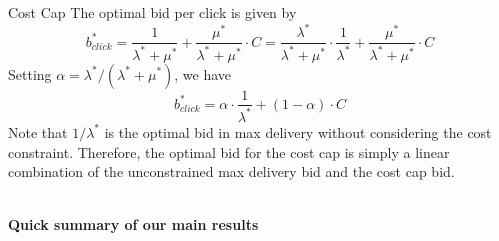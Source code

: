 \documentclass[../main.tex]{subfiles}
\begin{document}
\begin{section}{Cost Cap}
	The optimal bid per click is given by 
	\begin{equation}
		b^*_{click} = \frac{1}{\lambda^* + \mu^*} + \frac{\mu^*}{\lambda^* + \mu^*} \cdot C =  \frac{\lambda^*}{\lambda^* + \mu^*} \cdot \frac{1}{\lambda^*}+ \frac{\mu^*}{\lambda^* + \mu^*} \cdot C
	\end{equation}
    Setting $\alpha = \lambda^*/(\lambda^* + \mu^*)$, we have 
    \begin{equation}
    	b^*_{click}  =  \alpha \cdot \frac{1}{\lambda^*}+ (1-\alpha) \cdot C
    \end{equation}
	Note that \(1 / \lambda^*\) is the optimal bid in max delivery without considering the cost constraint. Therefore, the optimal bid for the cost cap is simply a linear combination of the unconstrained max delivery bid and the cost cap bid.
	
	\textbf{\\Quick summary of our main results}
	
	\end{section}
	
\end{document}
